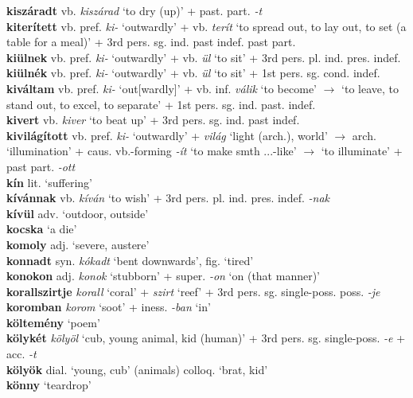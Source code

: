 \documentclass[11pt]{article}
\begin{document}
\textbf{kiszáradt} vb. \emph{kiszárad} `to dry (up)' +
past. part. \emph{-t} \\
\textbf{kiterített} vb. pref. \emph{ki-} `outwardly' +
vb. \emph{terít} `to spread out, to lay out, to set (a table for a
meal)' + 3rd pers. sg. ind. past indef. \textbar\textbar{} past part. \\
\textbf{kiülnek} vb. pref. \emph{ki-} `outwardly' + vb. \emph{ül}
`to sit' + 3rd pers. pl. ind. pres. indef. \\
\textbf{kiülnék} vb. pref. \emph{ki-} `outwardly' + vb. \emph{ül}
`to sit' + 1st pers. sg. cond. indef. \\
\textbf{kiváltam} vb. pref. \emph{ki-} `out[wardly]' + vb. inf. \emph{válik} `to
become' $\rightarrow$ `to leave, to stand out, to excel, to separate'
+ 1st pers. sg. ind. past. indef. \\
\textbf{kivert} vb. \emph{kiver} `to beat up' + 3rd
pers. sg. ind. past indef. \\
\textbf{kivilágított} vb. pref. \emph{ki-} `outwardly' + \emph{világ}
`light (arch.), world' $\rightarrow$ arch. `illumination' +
    caus. vb.-forming \emph{-ít} `to make smth ...-like' $\rightarrow$
`to illuminate' + past part. \emph{-ott} \\
\textbf{kín} lit. `suffering' \\
\textbf{kívánnak} vb. \emph{kíván} `to wish' + 3rd
pers. pl. ind. pres. indef. \emph{-nak} \\
\textbf{kívül} adv. `outdoor, outside' \\
\textbf{kocska} `a die' \\
\textbf{komoly} adj. `severe, austere' \\
\textbf{konnadt} syn. \emph{kókadt} `bent downwards', fig. `tired' \\
\textbf{konokon} adj. \emph{konok} `stubborn' + super. \emph{-on}
`on (that manner)' \\
\textbf{korallszirtje} \emph{korall} `coral' + \emph{szirt} `reef' + 3rd
pers. sg. single\hyp{}poss. poss. \emph{-je} \\
\textbf{koromban} \emph{korom} `soot' + iness. \emph{-ban}
`in' \\
\textbf{költemény} `poem' \\
\textbf{kölykét} \emph{kölyöl} `cub, young animal, kid (human)'
+ 3rd pers. sg. single\hyp{}poss. \emph{-e} + acc. \emph{-t} \\
\textbf{kölyök} dial. `young, cub' (animals) \textbar\textbar{}
colloq. `brat, kid' \\
\textbf{könny} `teardrop' \\
\end{document}
